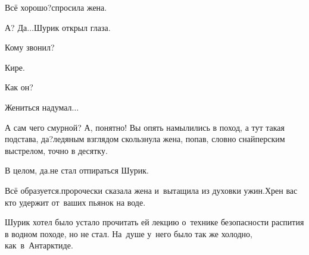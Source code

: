 {	\diagdash Всё хорошо?\mdash спросила жена.
	
	\diagdash А? Да$\ldots$\mdash Шурик открыл глаза.
	
	\diagdash Кому звонил?
	
	\diagdash Кире.
	
	\diagdash Как он? 
	
	\diagdash Жениться надумал$\ldots$ 
	
	\diagdash А сам чего смурной? А, понятно! Вы опять намылились в поход, а тут такая подстава, да?\mdash ледяным взглядом скользнула жена, попав, словно снайперским выстрелом, точно в десятку.%
	
	\diagdash В целом, да.\mdash не стал отпираться Шурик.
	
	\diagdash Всё образуется.\mdash пророчески сказала жена и~вытащила из духовки ужин.\mdash Хрен вас кто удержит от~ваших пьянок на воде.
	
	Шурик хотел было устало прочитать ей лекцию о~технике безопасности распития в водном походе, но не стал.  На~душе у~него было так же холодно, как~в~Антарктиде.%
	
	\vspace{-0.2cm}
%	
	\begin{center}
	\end{center}
}